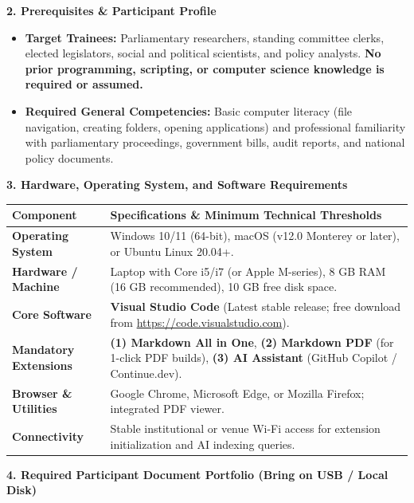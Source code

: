\documentclass[10pt, a4paper]{article}
\begin{document}
\vspace{0.25cm}
\noindent\textbf{\textcolor{tanzaniablue}{\large 2. Prerequisites \& Participant Profile}}
\vspace{0.1cm}
\begin{itemize}
    \item \textbf{Target Trainees:} Parliamentary researchers, standing committee clerks, elected legislators, social and political scientists, and policy analysts. \textbf{No prior programming, scripting, or computer science knowledge is required or assumed.}
    \item \textbf{Required General Competencies:} Basic computer literacy (file navigation, creating folders, opening applications) and professional familiarity with parliamentary proceedings, government bills, audit reports, and national policy documents.
\end{itemize}

\vspace{0.25cm}
\noindent\textbf{\textcolor{tanzaniablue}{\large 3. Hardware, Operating System, and Software Requirements}}
\vspace{0.1cm}
\begin{table}[htbp]
\centering
\small
\begin{tabular}{@{}>{\bfseries}p{3.2cm}p{13.2cm}@{}}
\toprule
Component & Specifications \& Minimum Technical Thresholds \\
\midrule
Operating System & Windows 10/11 (64-bit), macOS (v12.0 Monterey or later), or Ubuntu Linux 20.04+. \\
Hardware / Machine & Laptop with Core i5/i7 (or Apple M-series), 8 GB RAM (16 GB recommended), 10 GB free disk space. \\
Core Software & \textbf{Visual Studio Code} (Latest stable release; free download from \url{https://code.visualstudio.com}). \\
Mandatory Extensions & \textbf{(1) Markdown All in One}, \textbf{(2) Markdown PDF} (for 1-click PDF builds), \textbf{(3) AI Assistant} (GitHub Copilot / Continue.dev). \\
Browser \& Utilities & Google Chrome, Microsoft Edge, or Mozilla Firefox; integrated PDF viewer. \\
Connectivity & Stable institutional or venue Wi-Fi access for extension initialization and AI indexing queries. \\
\bottomrule
\end{tabular}
\end{table}

\vspace{-0.15cm}
\noindent\textbf{\textcolor{tanzaniablue}{\large 4. Required Participant Document Portfolio (Bring on USB / Local Disk)}}
\vspace{0.1cm}
\end{document}
